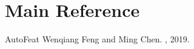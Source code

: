 \documentclass[letterpaper,11pt,english]{sphinxmanual}
\begin{document}
\section{Main Reference}
\label{\detokenize{reference:main-reference}}\label{\detokenize{reference:reference}}\label{\detokenize{reference::doc}}
\begin{sphinxthebibliography}{AutoFeat}
Wenqiang Feng and Ming Chen.
, 2019.
\end{sphinxthebibliography}



\renewcommand{\indexname}{Index}
\printindex
\end{document}
